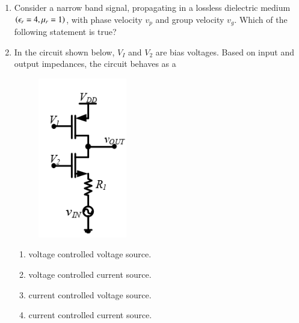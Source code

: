 \documentclass[a4paper, 11pt]{article}
\begin{document}
\begin{enumerate}
    \hfill{}
    
    \item Consider a narrow band signal, propagating in a lossless dielectric medium $\left(\epsilon_r = 4, \mu_r = 1\right)$, with phase velocity $v_p$ and group velocity $v_g$. Which of the following statement is true? 
    
    \begin{enumerate}
    \end{enumerate}
    
    \hfill{}

    \item In the circuit shown below, $V_I$ and $V_2$ are bias voltages. Based on input and output impedances, the circuit behaves as a
    \begin{figure}[H]
        \centering
        \includegraphics[width=0.4\columnwidth]{figs/Q11.png}
        \caption*{}
        \label{fig:q21}
    \end{figure}
    \begin{enumerate}
        \item voltage controlled voltage source.
        \item voltage controlled current source.
        \item current controlled voltage source.
        \item current controlled current source.
    \end{enumerate}
    

\end{enumerate}
\end{document}
